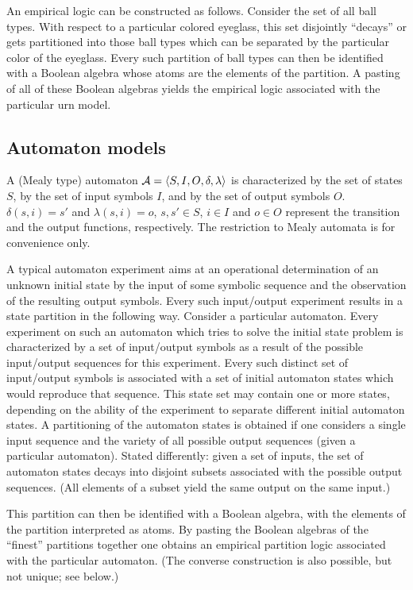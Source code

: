 An empirical logic can be constructed as follows.
Consider the set of all ball types.
With respect to a particular colored eyeglass, this set disjointly ``decays''
or gets partitioned into those ball types which can be separated by the particular color of
the eyeglass.
Every such partition of ball types can then be identified with a Boolean algebra whose atoms are the elements of the partition.
A pasting of all of these Boolean algebras yields the empirical logic associated with
the particular urn model.



\subsection{Automaton models}
A (Mealy type) automaton
${\cal A}=\langle S,I,O,\delta ,\lambda \rangle$ is characterized
by the set of states $S$,
by the set of input symbols $I$,
and by the set of output symbols $O$.
$\delta (s,i)=s'$ and
$\lambda (s,i)=o$,
$s,s'\in S$,
$i\in I$
and $o\in O$
represent the transition and the output functions, respectively.
The restriction to Mealy automata is for convenience only.


A typical automaton experiment aims at
an operational determination of an unknown initial state
by the input of some symbolic sequence and the observation of the resulting output symbols.
Every such input/output experiment results
in a state partition in the following way.
Consider a particular automaton.
Every experiment on such an automaton which tries to
solve the initial state problem is characterized
by a set of input/output symbols
as a result of the possible input/output sequences for this experiment.
Every such distinct set of input/output symbols is associated with a set of initial automaton
states which would reproduce that sequence.
This state set may contain one or more states, depending on the ability of the experiment
to separate different initial automaton states.
A partitioning of the automaton states is obtained if one considers
a single input sequence and the variety of all
possible output sequences (given a particular automaton).
Stated differently:
given a set of inputs, the set of automaton states decays into disjoint
subsets associated with the possible output sequences.
(All elements of a subset yield the same output on the same input.)

This partition can then be identified with a Boolean algebra,
with the elements of the partition interpreted as atoms.
By pasting the Boolean algebras of the ``finest'' partitions together one obtains
an empirical partition logic associated with the particular automaton.
(The converse construction is also possible, but not unique; see below.)


